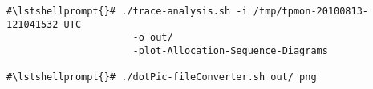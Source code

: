 \begin{lstlisting}[caption=Command to produce a sequence diagram]
#\lstshellprompt{}# ./trace-analysis.sh -i /tmp/tpmon-20100813-121041532-UTC
                      -o out/
                      -plot-Allocation-Sequence-Diagrams
					  
#\lstshellprompt{}#	./dotPic-fileConverter.sh out/ png			  
\end{lstlisting}
